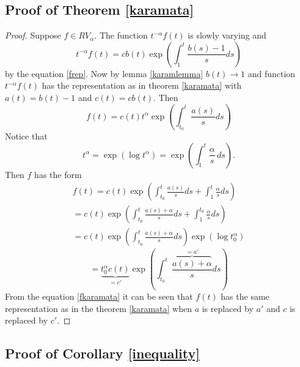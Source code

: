 \documentclass[english,12pt,a4paper,pdftex,sci,utf8]{aaltothesis} %
\begin{document}
\subsection{Proof of Theorem \ref{karamata}}

\begin{proof}
Suppose $f \in RV_{\alpha}$. The function $t^{-\alpha}f(t)$ is slowly varying and
\begin{equation*}
t^{-\alpha}f(t) = cb(t) \exp \left( \int_{1}^{t} \frac{b(s)-1}{s}ds \right)
\end{equation*}
by the equation \eqref{frep}. Now by lemma \ref{karamlemma} $b(t) \rightarrow 1$ and function $t^{-\alpha}f(t)$ has the representation as in theorem \ref{karamata} with $a(t)=b(t)-1$ and $c(t)=cb(t)$. Then
\begin{equation*}
f(t) = c(t)t^{\alpha} \exp \left(  \int_{t_0}^{t} \frac{a(s)}{s}ds  \right)
\end{equation*}
Notice that $$t^{\alpha}=\exp \left( \log t^{\alpha} \right)=\exp \left(  \int_{1}^{t} \frac{\alpha}{s}\,ds  \right).$$ Then $f$ has the form
\begin{equation*}
\begin{split}
f(t) = c(t) \exp \left(  \int_{t_0}^{t} \frac{a(s)}{s}ds + \int_{1}^{t} \frac{\alpha}{s}ds  \right) \\
= c(t) \exp \left(  \int_{t_0}^{t} \frac{a(s)+\alpha}{s}ds + \int_{1}^{t_0} \frac{\alpha}{s}ds  \right)\\
= c(t) \exp \left(  \int_{t_0}^{t} \frac{a(s)+\alpha}{s}ds \right) \exp \left( \log t_0^{\alpha}  \right)
\end{split}
\end{equation*}
\begin{equation}
= \underbrace{t_0^{\alpha}c(t)}_{=c'} \exp \left(  \int_{t_0}^{t} \frac{\overbrace{a(s)+\alpha}^{=a'}}{s}ds \right)
\label{fkaramata}
\end{equation}
From the equation \eqref{fkaramata} it can be seen that $f(t)$ has the same representation as in the theorem \ref{karamata} when $a$ is replaced by $a'$ and $c$ is replaced by $c'$.
\end{proof}

\subsection{Proof of Corollary \ref{inequality}}
\end{document}
